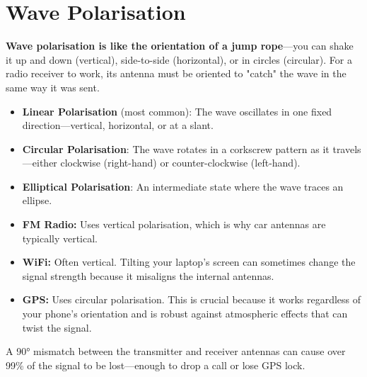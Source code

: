 
\chapter{Wave Polarisation}
\label{ch:polarisation}

\begin{nontechnical}
    \textbf{Wave polarisation is like the orientation of a jump rope}---you can shake it up and down (vertical), side-to-side (horizontal), or in circles (circular). For a radio receiver to work, its antenna must be oriented to "catch" the wave in the same way it was sent.

    \begin{itemize}
        \item \textbf{Linear Polarisation} (most common): The wave oscillates in one fixed direction---vertical, horizontal, or at a slant.
        \item \textbf{Circular Polarisation}: The wave rotates in a corkscrew pattern as it travels---either clockwise (right-hand) or counter-clockwise (left-hand).
        \item \textbf{Elliptical Polarisation}: An intermediate state where the wave traces an ellipse.
    \end{itemize}

    \begin{itemize}
        \item \textbf{FM Radio:} Uses vertical polarisation, which is why car antennas are typically vertical.
        \item \textbf{WiFi:} Often vertical. Tilting your laptop's screen can sometimes change the signal strength because it misaligns the internal antennas.
        \item \textbf{GPS:} Uses circular polarisation. This is crucial because it works regardless of your phone's orientation and is robust against atmospheric effects that can twist the signal.
    \end{itemize}

     A 90° mismatch between the transmitter and receiver antennas can cause over 99\% of the signal to be lost---enough to drop a call or lose GPS lock.
\end{nontechnical}


